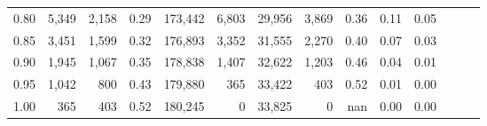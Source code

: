 \begin{tabular}{rrrrrrrrrrrrrr}
0.80 &   5,349 &  2,158 &  0.29 &  173,442 &    6,803 &  29,956 &   3,869 &  0.36 &  0.11 &      0.05 \\
0.85 &   3,451 &  1,599 &  0.32 &  176,893 &    3,352 &  31,555 &   2,270 &  0.40 &  0.07 &      0.03 \\
0.90 &   1,945 &  1,067 &  0.35 &  178,838 &    1,407 &  32,622 &   1,203 &  0.46 &  0.04 &      0.01 \\
0.95 &   1,042 &    800 &  0.43 &  179,880 &      365 &  33,422 &     403 &  0.52 &  0.01 &      0.00 \\
1.00 &     365 &    403 &  0.52 &  180,245 &        0 &  33,825 &       0 &   nan &  0.00 &      0.00 \\
\bottomrule
\end{tabular}
